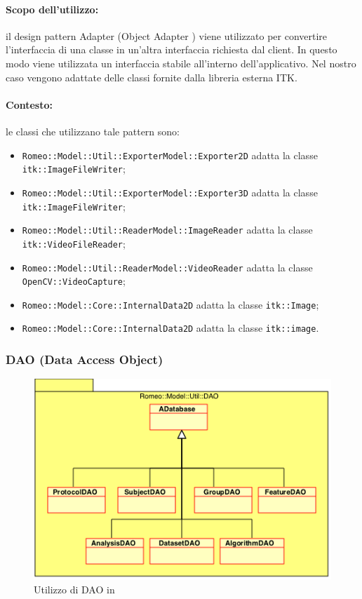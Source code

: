 \paragraph{Scopo dell'utilizzo:} il design pattern\g{} Adapter (Object Adapter ) viene utilizzato per convertire l'interfaccia di una classe in un'altra interfaccia richiesta dal client. In questo modo viene utilizzata un interfaccia stabile all'interno dell'applicativo.
 Nel nostro caso vengono adattate delle classi fornite dalla libreria esterna ITK\g{}. 
\paragraph{Contesto:} le classi che utilizzano tale pattern sono:
\begin{itemize}
	\item \verb!Romeo::Model::Util::ExporterModel::Exporter2D! adatta la classe \verb!itk::ImageFileWriter!;
	\item \verb!Romeo::Model::Util::ExporterModel::Exporter3D! adatta la classe \verb!itk::ImageFileWriter!;
	\item \verb!Romeo::Model::Util::ReaderModel::ImageReader! adatta la classe \verb!itk::VideoFileReader!;
	\item \verb!Romeo::Model::Util::ReaderModel::VideoReader! adatta la classe \verb!OpenCV::VideoCapture!;
	\item \verb!Romeo::Model::Core::InternalData2D! adatta la classe \verb!itk::Image!;
	\item \verb!Romeo::Model::Core::InternalData2D! adatta la classe \verb!itk::image!.
\end{itemize}


\subsubsection{DAO (Data Access Object)}
\label{strutt_DAO}
\begin{figure}[!h]
		\centering
		\includegraphics[width=0.7\linewidth]{./Content/Immagini/DAO_dp.png}
		\caption{Utilizzo di DAO in \project{}}
		\label{romeo_DAO}
\end{figure}
